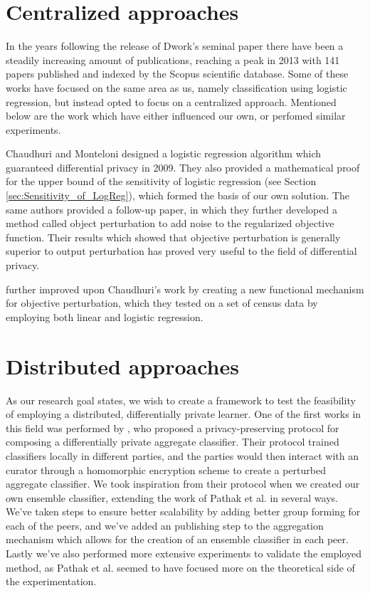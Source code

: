 \section{Centralized approaches}
In the years following the release of Dwork's seminal paper there have been a steadily increasing amount of publications, reaching a peak in 2013 with 141 papers published and indexed by the Scopus scientific database. Some of these works have focused on the same area as us, namely classification using logistic regression, but instead opted to focus on a centralized approach. Mentioned below are the work which have either influenced our own, or perfomed similar experiments. 


Chaudhuri and Monteloni designed a logistic regression algorithm which guaranteed differential privacy in 2009. They also provided a mathematical proof for the upper bound of the sensitivity of logistic regression (see Section \ref{sec:Sensitivity_of_LogReg}), which formed the basis of our own solution. The same authors provided a follow-up paper\citep{chaudhuri2011riskMinimization}, in which they further developed a method called object perturbation to add noise to the regularized objective function. Their results which showed that objective perturbation is generally superior to output perturbation has proved very useful to the field of differential privacy. 

\cite{zhang2012functionMechanism} further improved upon Chaudhuri's work by creating a new functional mechanism for objective perturbation, which they tested on a set of census data by employing both linear and logistic regression. 

\section{Distributed approaches}
As our research goal states, we wish to create a framework to test the feasibility of employing a distributed, differentially private learner. One of the first works in this field was performed by  \cite{pathak2010diffprivhomo}, who proposed a privacy-preserving protocol for composing a differentially private aggregate classifier. Their protocol trained classifiers locally in different parties, and the parties would then interact with an curator through a homomorphic encryption scheme to create a perturbed aggregate classifier. We took inspiration from their protocol when we created our own ensemble classifier, extending the work of Pathak et al. in several ways. We've taken steps to ensure better scalability by adding better group forming for each of the peers, and we've added an publishing step to the aggregation mechanism which allows for the creation of an ensemble classifier in each peer. Lastly we've also performed more extensive experiments to validate the employed method, as Pathak et al. seemed to have focused more on the theoretical side of the experimentation. 

